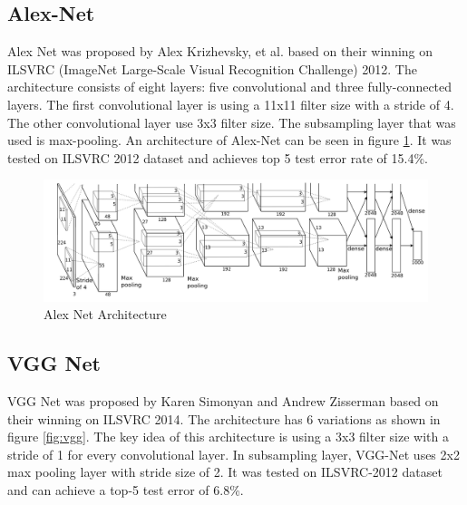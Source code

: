 \subsection{Alex-Net}
Alex Net was proposed by Alex Krizhevsky, et al. \cite{krizhevsky2012imagenet} based on their winning on ILSVRC (ImageNet Large-Scale Visual Recognition Challenge) 2012. The architecture consists of eight layers: five convolutional and three fully-connected layers. The first convolutional layer is using a 11x11 filter size with a stride of 4. The other convolutional layer use 3x3 filter size. The subsampling layer that was used is max-pooling. An architecture of Alex-Net can be seen in figure \ref{fig:alexnet}. It was tested on ILSVRC 2012 dataset and achieves top 5 test error rate of 15.4\%.
\begin{figure}[h]
	\includegraphics[scale=0.25]{figures/alexnet}
	\centering
	\caption{Alex Net Architecture \cite{krizhevsky2012imagenet}}
	\label{fig:alexnet}
\end{figure}



\subsection{VGG Net}
VGG Net was proposed by Karen Simonyan and Andrew Zisserman \cite{simonyan2014very} based on their winning on ILSVRC 2014. The architecture has 6 variations as shown in figure \ref{fig:vgg}. The key idea of this architecture is using a 3x3 filter size with a stride of 1 for every convolutional layer. In subsampling layer, VGG-Net uses 2x2 max pooling layer with stride size of 2. It was tested on ILSVRC-2012 dataset and can achieve a top-5 test error of 6.8\%.

